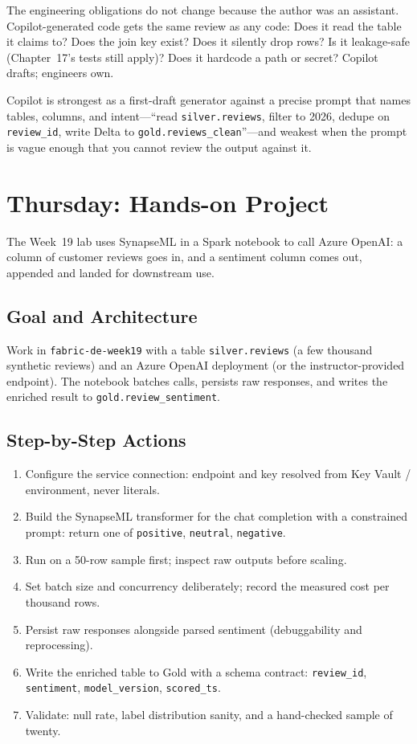 The engineering obligations do not change because the author was an assistant. Copilot-generated code gets the same review as any code: Does it read the table it claims to? Does the join key exist? Does it silently drop rows? Is it leakage-safe (Chapter~17's tests still apply)? Does it hardcode a path or secret? Copilot drafts; engineers own.

\begin{tipbox}
Copilot is strongest as a first-draft generator against a precise prompt that names tables, columns, and intent---``read \texttt{silver.reviews}, filter to 2026, dedupe on \texttt{review\_id}, write Delta to \texttt{gold.reviews\_clean}''---and weakest when the prompt is vague enough that you cannot review the output against it.
\end{tipbox}

\section{Thursday: Hands-on Project}
The Week~19 lab uses SynapseML in a Spark notebook to call Azure OpenAI: a column of customer reviews goes in, and a sentiment column comes out, appended and landed for downstream use.

\subsection{Goal and Architecture}
Work in \texttt{fabric-de-week19} with a table \texttt{silver.reviews} (a few thousand synthetic reviews) and an Azure OpenAI deployment (or the instructor-provided endpoint). The notebook batches calls, persists raw responses, and writes the enriched result to \texttt{gold.review\_sentiment}.

\subsection{Step-by-Step Actions}
\begin{enumerate}
    \item Configure the service connection: endpoint and key resolved from Key Vault / environment, never literals.
    \item Build the SynapseML transformer for the chat completion with a constrained prompt: return one of \texttt{positive}, \texttt{neutral}, \texttt{negative}.
    \item Run on a 50-row sample first; inspect raw outputs before scaling.
    \item Set batch size and concurrency deliberately; record the measured cost per thousand rows.
    \item Persist raw responses alongside parsed sentiment (debuggability and reprocessing).
    \item Write the enriched table to Gold with a schema contract: \texttt{review\_id}, \texttt{sentiment}, \texttt{model\_version}, \texttt{scored\_ts}.
    \item Validate: null rate, label distribution sanity, and a hand-checked sample of twenty.
\end{enumerate}

